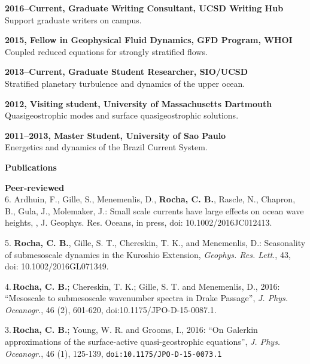 \documentclass[a4paper,11pt,final]{memoir}
\newcommand{\Sep}{\vspace{1.25em}}
\newcommand{\SmallSep}{\vspace{0.5em}}
\newcommand{\CVSection}[1]
    {\Large\textbf{#1}\par
    \SmallSep\normalsize\normalfont}
\newcommand{\CVItem}[1]
    {\textbf{\color{NavyBlue} #1}}
\begin{document}
\CVItem{2016--Current, Graduate Writing Consultant, UCSD Writing Hub}\\
Support graduate writers on campus.

\SmallSep
\CVItem{2015, Fellow in Geophysical Fluid Dynamics, GFD Program, WHOI}\\
Coupled reduced equations for strongly stratified flows.
\SmallSep

\CVItem{2013--Current, Graduate Student Researcher, SIO/UCSD}\\
Stratified planetary turbulence and dynamics of the upper ocean.
\SmallSep

\CVItem{2012, Visiting student, University of Massachusetts Dartmouth}\\
Quasigeostrophic modes and surface quasigeostrophic solutions.
\SmallSep

\CVItem{2011--2013, Master Student, University of Sao Paulo}\\
Energetics and dynamics of the Brazil Current System.


\Sep

\CVSection{Publications}


\CVItem{Peer-reviewed}\\

6. Ardhuin, F., Gille, S., Menemenlis, D., \textbf{Rocha, C. B.}, Rascle, N., Chapron, B., Gula, J., Molemaker, J.: Small scale currents have large effects on ocean wave heights,
, J. Geophys. Res. Oceans, in press, doi: 10.1002/2016JC012413.

\SmallSep

5.  \textbf{Rocha, C. B.},  Gille, S. T., Chereskin, T. K., and Menemenlis, D.: Seasonality of submesoscale dynamics in the Kuroshio Extension, \textit{Geophys. Res. Lett.}, 43,
doi: 10.1002/2016GL071349.

\SmallSep

4.\,\textbf{Rocha, C. B.};  Chereskin, T. K.; Gille, S. T. and Menemenlis, D., 2016: ``Mesoscale to submesoscale wavenumber spectra in Drake Passage'', \textit{J. Phys. Oceanogr.}, 46 (2), 601-620, doi:10.1175/JPO-D-15-0087.1.

\SmallSep

3.\,\textbf{Rocha, C. B.};  Young, W. R. and Grooms, I., 2016: ``On Galerkin approximations of the surface-active quasi-geostrophic equations'', \textit{J. Phys. Oceanogr.}, 46 (1), 125-139, \texttt{doi:10.1175/JPO-D-15-0073.1}
\end{document}
